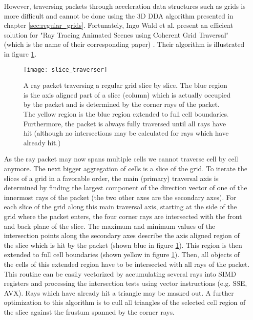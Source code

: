 However, traversing packets through acceleration data structures such as grids is more difficult and cannot be done using the 3D DDA algorithm presented in chapter \ref{sec:regular_grids}. Fortunately, Ingo Wald et al. present an efficient solution for "Ray Tracing Animated Scenes using Coherent Grid Traversal" (which is the name of their corresponding paper) \cite{packet_caster}. Their algorithm is illustrated in figure \ref{fig:slice_traverser}.

\begin{figure}
\centering
\texttt{[image: slice\_traverser]}
\caption{A ray packet traversing a regular grid slice by slice. The blue region is the axis aligned part of a slice (column) which is actually occupied by the packet and is determined by the corner rays of the packet. The yellow region is the blue region extended to full cell boundaries. Furthermore, the packet is always fully traversed until all rays have hit (although no intersections may be calculated for rays which have already hit.)}
\label{fig:slice_traverser} 
\end{figure}

As the ray packet may now spans multiple cells we cannot traverse cell by cell anymore. The next bigger aggregation of cells is a slice of the grid. To iterate the slices of a grid in a favorable order, the main (primary) traversal axis is determined by finding the largest component of the direction vector of one of the innermost rays of the packet (the two other axes are the secondary axes). For each slice of the grid along this main traversal axis, starting at the side of the grid where the packet enters, the four corner rays are intersected with the front and back plane of the slice. The maximum and minimum values of the intersection points along the secondary axes describe the axis aligned region of the slice which is hit by the packet (shown blue in figure \ref{fig:slice_traverser}). This region is then extended to full cell boundaries (shown yellow in figure \ref{fig:slice_traverser}). Then, all objects of the cells of this extended region have to be intersected with all rays of the packet. This routine can be easily vectorized by accumulating several rays into SIMD registers and processing the intersection tests using vector instructions (e.g. SSE, AVX). Rays which have already hit a triangle may be masked out. A further optimization to this algorithm is to cull all triangles of the selected cell region of the slice against the frustum spanned by the corner rays.


